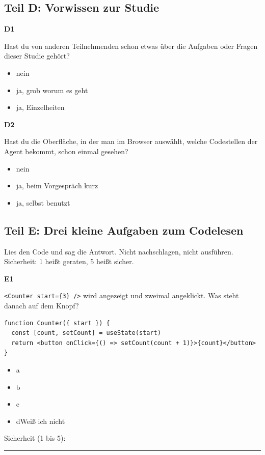 \subsection*{Teil D: Vorwissen zur Studie}

\noindent\begin{minipage}{\linewidth}
\textbf{D1}\par
Hast du von anderen Teilnehmenden schon etwas über die Aufgaben oder Fragen dieser Studie gehört?

\begin{itemize}[nosep,leftmargin=2.4em]
\item[\kreuz] nein
\item[\kreuz] ja, grob worum es geht
\item[\kreuz] ja, Einzelheiten
\end{itemize}
\end{minipage}

\medskip

\noindent\begin{minipage}{\linewidth}
\textbf{D2}\par
Hast du die Oberfläche, in der man im Browser auswählt, welche Codestellen der Agent bekommt, schon einmal gesehen?

\begin{itemize}[nosep,leftmargin=2.4em]
\item[\kreuz] nein
\item[\kreuz] ja, beim Vorgespräch kurz
\item[\kreuz] ja, selbst benutzt
\end{itemize}
\end{minipage}

\medskip

\subsection*{Teil E: Drei kleine Aufgaben zum Codelesen}

Lies den Code und sag die Antwort. Nicht nachschlagen, nicht ausführen. Sicherheit: 1 heißt geraten, 5 heißt sicher.

\noindent\begin{minipage}{\linewidth}
\textbf{E1}\par
\texttt{<Counter start=\{3\} /\allowbreak{}>} wird angezeigt und zweimal angeklickt. Was steht danach auf dem Knopf?

{\small
\begin{verbatim}
function Counter({ start }) {
  const [count, setCount] = useState(start)
  return <button onClick={() => setCount(count + 1)}>{count}</button>
}
\end{verbatim}
}
\begin{itemize}[nosep,leftmargin=2.4em]
\item[\kreuz] a
\item[\kreuz] b
\item[\kreuz] c
\item[\kreuz] d\quad Weiß ich nicht
\end{itemize}
\noindent Sicherheit (1 bis 5):~\rule{2.5em}{0.4pt}\par
\end{minipage}

